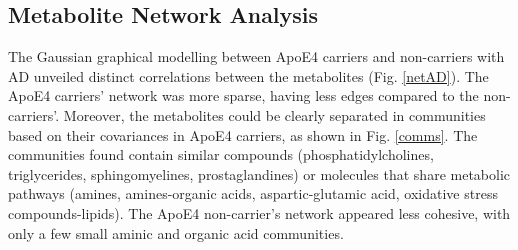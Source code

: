 \documentclass{amsart}
\begin{document}
\subsection{Metabolite Network Analysis}
The Gaussian graphical modelling between ApoE4 carriers and non-carriers with AD unveiled distinct correlations between the metabolites (Fig. \ref{netAD}). The ApoE4 carriers' network was more sparse, having less edges compared to the non-carriers'.  Moreover, the metabolites could be clearly separated in communities based on their covariances in ApoE4 carriers, as shown in Fig. \ref{comms}. The communities found contain similar compounds (phosphatidylcholines, triglycerides, sphingomyelines, prostaglandines) or molecules that share metabolic pathways (amines, amines-organic acids, aspartic-glutamic acid, oxidative stress compounds-lipids). The ApoE4 non-carrier's network appeared less cohesive, with only a few small aminic and organic acid communities.
\end{document}
